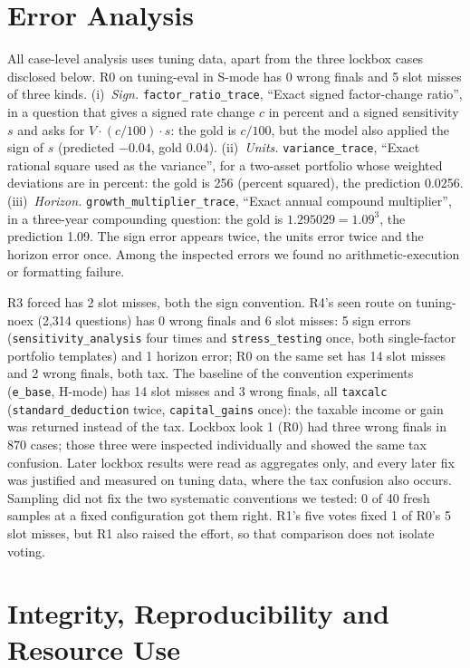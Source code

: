 \documentclass[conference]{IEEEtran}
\newcommand{\id}[1]{\texttt{#1}}
\begin{document}
\section{Error Analysis}\label{sec:errors}
All case-level analysis uses tuning data, apart from the three lockbox cases disclosed below. R0 on tuning-eval in S-mode has 0 wrong finals and 5 slot misses of three kinds. (i)~\emph{Sign.} \id{factor\_ratio\_trace}, ``Exact signed factor-change ratio'', in a question that gives a signed rate change $c$ in percent and a signed sensitivity $s$ and asks for $V\cdot(c/100)\cdot s$: the gold is $c/100$, but the model also applied the sign of $s$ (predicted $-0.04$, gold $0.04$). (ii)~\emph{Units.} \id{variance\_trace}, ``Exact rational square used as the variance'', for a two-asset portfolio whose weighted deviations are in percent: the gold is 256 (percent squared), the prediction 0.0256. (iii)~\emph{Horizon.} \id{growth\_multiplier\_trace}, ``Exact annual compound multiplier'', in a three-year compounding question: the gold is $1.295029=1.09^3$, the prediction 1.09. The sign error appears twice, the units error twice and the horizon error once. Among the inspected errors we found no arithmetic-execution or formatting failure.

R3 forced has 2 slot misses, both the sign convention. R4's seen route on tuning-noex (2,314 questions) has 0 wrong finals and 6 slot misses: 5 sign errors (\id{sensitivity\_analysis} four times and \id{stress\_testing} once, both single-factor portfolio templates) and 1 horizon error; R0 on the same set has 14 slot misses and 2 wrong finals, both tax. The baseline of the convention experiments (\id{e\_base}, H-mode) has 14 slot misses and 3 wrong finals, all \id{taxcalc} (\id{standard\_deduction} twice, \id{capital\_gains} once): the taxable income or gain was returned instead of the tax. Lockbox look 1 (R0) had three wrong finals in 870 cases; those three were inspected individually and showed the same tax confusion. Later lockbox results were read as aggregates only, and every later fix was justified and measured on tuning data, where the tax confusion also occurs. Sampling did not fix the two systematic conventions we tested: 0 of 40 fresh samples at a fixed configuration got them right. R1's five votes fixed 1 of R0's 5 slot misses, but R1 also raised the effort, so that comparison does not isolate voting.

\section{Integrity, Reproducibility and Resource Use}\label{sec:integrity}

\end{document}
